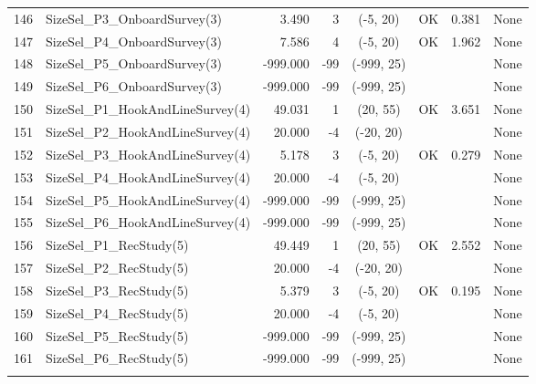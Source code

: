 \documentclass[12pt,]{article}
\begin{document}
\begin{landscape}
\begin{longtable}{rlrrcccl}
  146 & SizeSel\_P3\_OnboardSurvey(3) & 3.490 & 3 & (-5, 20) & OK & 0.381 & None \\ 
  147 & SizeSel\_P4\_OnboardSurvey(3) & 7.586 & 4 & (-5, 20) & OK & 1.962 & None \\ 
  148 & SizeSel\_P5\_OnboardSurvey(3) & -999.000 & -99 & (-999, 25) &  &  & None \\ 
  149 & SizeSel\_P6\_OnboardSurvey(3) & -999.000 & -99 & (-999, 25) &  &  & None \\ 
  150 & SizeSel\_P1\_HookAndLineSurvey(4) & 49.031 & 1 & (20, 55) & OK & 3.651 & None \\ 
  151 & SizeSel\_P2\_HookAndLineSurvey(4) & 20.000 & -4 & (-20, 20) &  &  & None \\ 
  152 & SizeSel\_P3\_HookAndLineSurvey(4) & 5.178 & 3 & (-5, 20) & OK & 0.279 & None \\ 
  153 & SizeSel\_P4\_HookAndLineSurvey(4) & 20.000 & -4 & (-5, 20) &  &  & None \\ 
  154 & SizeSel\_P5\_HookAndLineSurvey(4) & -999.000 & -99 & (-999, 25) &  &  & None \\ 
  155 & SizeSel\_P6\_HookAndLineSurvey(4) & -999.000 & -99 & (-999, 25) &  &  & None \\ 
  156 & SizeSel\_P1\_RecStudy(5) & 49.449 & 1 & (20, 55) & OK & 2.552 & None \\ 
  157 & SizeSel\_P2\_RecStudy(5) & 20.000 & -4 & (-20, 20) &  &  & None \\ 
  158 & SizeSel\_P3\_RecStudy(5) & 5.379 & 3 & (-5, 20) & OK & 0.195 & None \\ 
  159 & SizeSel\_P4\_RecStudy(5) & 20.000 & -4 & (-5, 20) &  &  & None \\ 
  160 & SizeSel\_P5\_RecStudy(5) & -999.000 & -99 & (-999, 25) &  &  & None \\ 
  161 & SizeSel\_P6\_RecStudy(5) & -999.000 & -99 & (-999, 25) &  &  & None \\ 
   \hline
\hline
\label{tab:model_params}
\end{longtable}
\end{landscape}

\newpage
\end{document}
